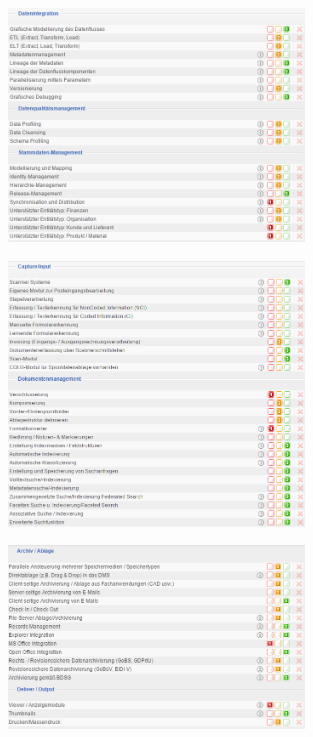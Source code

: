 \documentclass[12pt]{article}
\begin{document}
\noindent
\begin{figure}[!h]
\centering
\includegraphics[width=0.7\textwidth]{images/tr33}
\end{figure}\FloatBarrier
\noindent
\begin{figure}[!h]
\centering
\includegraphics[width=0.7\textwidth]{images/tr34}
\end{figure}\FloatBarrier
\noindent
\begin{figure}[!h]
\centering
\includegraphics[width=0.7\textwidth]{images/tr35}
\end{figure}\FloatBarrier
\end{document}
